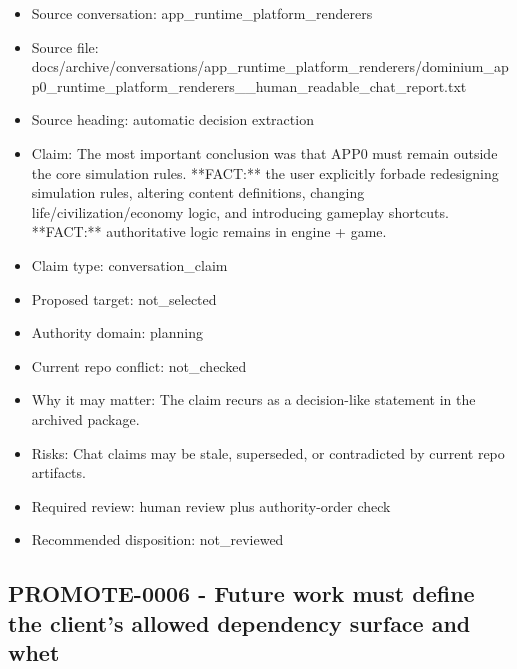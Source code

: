\documentclass[11pt,a4paper]{report}
\begin{document}
\begin{itemize}
\item Source conversation: app\_runtime\_platform\_renderers
\item Source file: docs/archive/conversations/app\_runtime\_platform\_renderers/dominium\_app0\_runtime\_platform\_renderers\_\_human\_readable\_chat\_report.txt
\item Source heading: automatic decision extraction
\item Claim: The most important conclusion was that APP0 must remain outside the core simulation rules. **FACT:** the user explicitly forbade redesigning simulation rules, altering content definitions, changing life/civilization/economy logic, and introducing gameplay shortcuts. **FACT:** authoritative logic remains in engine + game.
\item Claim type: conversation\_claim
\item Proposed target: not\_selected
\item Authority domain: planning
\item Current repo conflict: not\_checked
\item Why it may matter: The claim recurs as a decision-like statement in the archived package.
\item Risks: Chat claims may be stale, superseded, or contradicted by current repo artifacts.
\item Required review: human review plus authority-order check
\item Recommended disposition: not\_reviewed
\end{itemize}

\subsection{PROMOTE-0006 - Future work must define the client's allowed dependency surface and whet}
\end{document}
